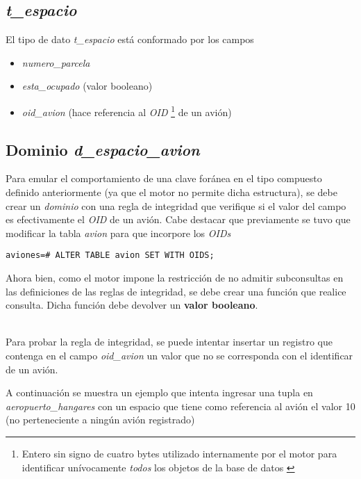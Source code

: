 \subsection{\emph{t\_espacio}}

El tipo de dato \emph{t\_espacio} está conformado por los campos
\begin{itemize}
    \item \emph{numero\_parcela} 
    \item \emph{esta\_ocupado} (valor booleano) 
    \item \emph{oid\_avion} (hace referencia al \emph{OID} \footnote{Entero sin signo de cuatro bytes utilizado internamente por el motor para identificar unívocamente \emph{todos} los objetos de la base de datos \autocite{oid}} de un avión)
\end{itemize}

\subsection{Dominio \emph{d\_espacio\_avion}}

Para emular el comportamiento de una clave foránea en el tipo compuesto definido anteriormente (ya que el motor no permite dicha estructura), se debe crear un \emph{dominio} con una regla de integridad que verifique si el valor del campo es efectivamente el \emph{OID} de un avión. Cabe destacar que previamente se tuvo que modificar la tabla \emph{avion} para que incorpore los \emph{OIDs}  

\vspace*{5mm}
\lstset{style=sql}
\begin{lstlisting}
aviones=# ALTER TABLE avion SET WITH OIDS;
\end{lstlisting}

Ahora bien, como el motor impone la restricción de no admitir subconsultas en las definiciones de las reglas de integridad, se debe crear una función que realice consulta. Dicha función debe devolver un \textbf{valor booleano}. 

~\\

Para probar la regla de integridad, se puede intentar insertar un registro que contenga en el campo \emph{oid\_avion} un valor que no se corresponda con el identificar de un avión. 

A continuación se muestra un ejemplo que intenta ingresar una tupla en \emph{aeropuerto\_hangares} con un espacio que tiene como referencia al avión el valor 10 (no perteneciente a ningún avión registrado)

